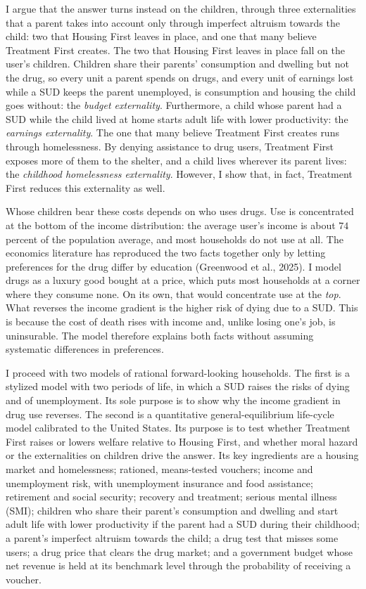 \documentclass[10pt]{article}
\begin{document}
I argue that the answer turns instead on the children, through three externalities that a parent takes into account only through imperfect altruism towards the child: two that Housing First leaves in place, and one that many believe Treatment First creates. The two that Housing First leaves in place fall on the user's children. Children share their parents' consumption and dwelling but not the drug, so every unit a parent spends on drugs, and every unit of earnings lost while a SUD keeps the parent unemployed, is consumption and housing the child goes without: the \emph{budget externality}. Furthermore, a child whose parent had a SUD while the child lived at home starts adult life with lower productivity: the \emph{earnings externality}. The one that many believe Treatment First creates runs through homelessness. By denying assistance to drug users, Treatment First exposes more of them to the shelter, and a child lives wherever its parent lives: the \emph{childhood homelessness externality}. However, I show that, in fact, Treatment First reduces this externality as well.

Whose children bear these costs depends on who uses drugs. Use is concentrated at the bottom of the income distribution: the average user's income is about $74$ percent of the population average, and most households do not use at all. The economics literature has reproduced the two facts together only by letting preferences for the drug differ by education (Greenwood et al., 2025). I model drugs as a luxury good bought at a price, which puts most households at a corner where they consume none. On its own, that would concentrate use at the \emph{top}.  What reverses the income gradient is the higher risk of dying due to a SUD. This is because the cost of death rises with income and, unlike losing one's job, is uninsurable. The model therefore explains both facts without assuming systematic differences in preferences.

I proceed with two models of rational forward-looking households. The first is a stylized model with two periods of life, in which a SUD raises the risks of dying and of unemployment. Its sole purpose is to show why the income gradient in drug use reverses. The second is a quantitative general-equilibrium life-cycle model calibrated to the United States. Its purpose is to test whether Treatment First raises or lowers welfare relative to Housing First, and whether moral hazard or the externalities on children drive the answer. Its key ingredients are a housing market and homelessness; rationed, means-tested vouchers; income and unemployment risk, with unemployment insurance and food assistance; retirement and social security; recovery and treatment; serious mental illness (SMI); children who share their parent's consumption and dwelling and start adult life with lower productivity if the parent had a SUD during their childhood; a parent's imperfect altruism towards the child; a drug test that misses some users; a drug price that clears the drug market; and a government budget whose net revenue is held at its benchmark level through the probability of receiving a voucher.
\end{document}
